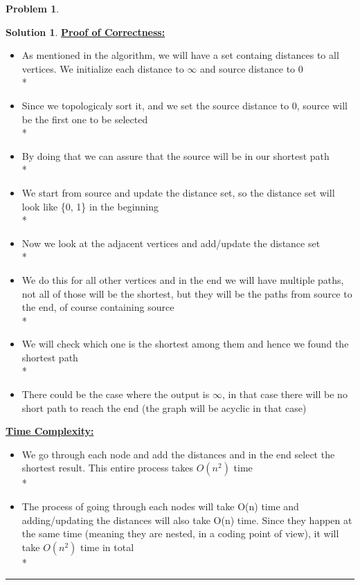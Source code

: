 \documentclass{article}
\theoremstyle{definition}
\newtheorem{problem}{Problem}
\def\fline{\rule{0.75\linewidth}{0.5pt}}
\newcommand{\finishline}{\vspace{-15pt}\begin{center}\fline\end{center}}
\newtheorem*{solution*}{Solution}
\newenvironment{solution}{\begin{solution*}}{{\finishline} \end{solution*}}
\begin{document}
\begin{problem}
\begin{enumerate}[label=(\alph*)]
\begin{solution}
				\textbf{\underline{Proof of Correctness:}}
					\begin{itemize}
						\item As mentioned in the algorithm, we will have a set containg distances to all vertices. We initialize each distance to $\infty$ and source distance to 0 \\*
						\item Since we topologicaly sort it, and we set the source distance to 0, source will be the first one to be selected \\*
						\item By doing that we can assure that the source will be in our shortest path\\*
						\item We start from source and update the distance set, so the distance set will look like \{0, 1\} in the beginning \\*
						\item Now we look at the adjacent vertices and add/update the distance set \\*
						\item We do this for all other vertices and in the end we will have multiple paths, not all of those will be the shortest, but they will be the paths from source to the end, of course containing source\\*
						\item We will check which one is the shortest among them and hence we found the shortest path \\*
						\item There could be the case where the output is $\infty$, in that case there will be no short path to reach the end (the graph will be acyclic in that case)
					\end{itemize} 				
				\textbf{\underline{Time Complexity:}}
					\begin{itemize}
						\item We go through each node and add the distances and in the end select the shortest result. This entire process takes $O(n^{2})$ time\\*
						\item The process of going through each nodes will take O(n) time and adding/updating the distances will also take O(n) time. Since they happen at the same time (meaning they are nested, in a coding point of view), it will take $O(n^{2})$ time in total \\*
					\end{itemize} 				
			\end{solution}


\end{enumerate}
\end{problem}
\end{document}
